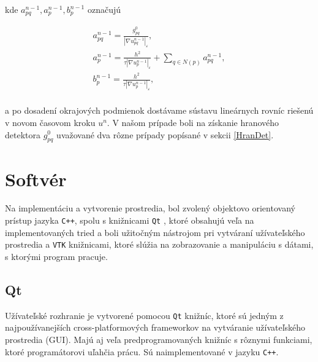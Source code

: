 \documentclass[a4paper,11pt,oneside]{article}%
\def\epsilon{\varepsilon}
\begin{document}
kde $a_{pq}^{n - 1}, a_p^{n - 1}, b_p^{n - 1}$ označujú

\begin{equation}
\begin{array}{l}
a_{pq}^{n - 1}  = \frac{g_{pq}^{0}}{|\nabla u_{pq}^{n-1}|_{\epsilon}}, \\
a_p^{n - 1} = \frac{h^2}{\tau|\nabla u_p^{n-1}|_{\epsilon}} + \sum_{q \in N(p)} a_{pq}^{n - 1}, \\
b_p^{n - 1} = \frac{h^2}{\tau|\nabla u_p^{n-1}|_{\epsilon}}, \\
\end{array}
\end{equation}

a po dosadení okrajových podmienok dostávame sústavu lineárnych rovníc riešenú v novom časovom kroku $u^n$. V našom prípade boli na získanie hranového detektora $g_{pq}^{0}$ uvažované dva rôzne prípady popísané v sekcii \ref{HranDet}.




\newpage
\section{Softvér}

Na implementáciu a vytvorenie prostredia, bol zvolený objektovo orientovaný prístup jazyka \texttt{C++}, spolu s knižnicami \texttt{Qt} \cite{qt}, ktoré obsahujú veľa na implementovaných tried a boli užitočným nástrojom pri vytváraní užívateľského prostredia a \texttt{VTK} \cite{vtk} knižnicami, ktoré slúžia na zobrazovanie a manipuláciu s dátami, s ktorými program pracuje. 

\subsection{Qt}
Užívateľské rozhranie je vytvorené pomocou \texttt{Qt} knižníc, ktoré sú jedným z najpoužívanejších cross-platformových frameworkov na vytváranie užívateľského prostredia (GUI). Majú aj veľa predprogramovaných knižníc s rôznymi funkciami, ktoré programátorovi uľahčia prácu. Sú naimplementované v jazyku \texttt{C++}. 
\end{document}
